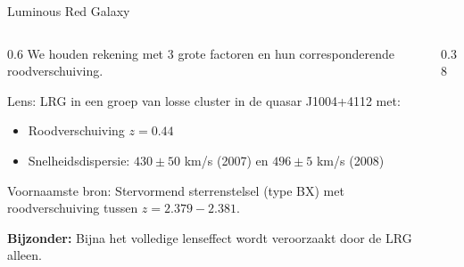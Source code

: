 \documentclass[aspectratio=169,xcolor=dvipsnames]{beamer}
\begin{document}
\begin{frame}{Luminous Red Galaxy}
    \begin{columns}[T] %

        \begin{column}{0.6\textwidth}
            We houden rekening met 3 grote factoren en hun corresponderende roodverschuiving.

            \vspace{0.2cm}
            Lens: LRG in een groep van losse cluster in de quasar J1004+4112 met:

            \vspace{0.2cm}
            \begin{itemize}
                \item Roodverschuiving $z = 0.44$
                \item Snelheidsdispersie: $430 \pm 50$ km/s (2007) en $496 \pm 5$ km/s (2008)
            \end{itemize}

            \vspace{0.2cm}
            Voornaamste bron: Stervormend sterrenstelsel (type BX) met roodverschuiving tussen $z = 2.379-2.381$.

            \vspace{0.2cm}
            \textbf{Bijzonder:} Bijna het volledige lenseffect wordt veroorzaakt door de LRG alleen.

            \vspace{0.2cm}


        \end{column}

        \begin{column}{0.38\textwidth}
        \end{column}

    \end{columns}
\end{frame}
\end{document}
